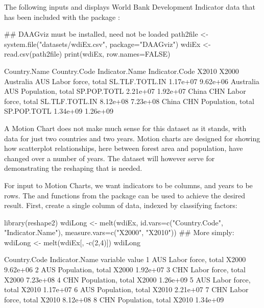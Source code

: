 The following inputs and displays World Bank Development Indicator
data that has been included with the package :
\begin{fullwidth}
\small
\begin{Schunk}
\begin{Sinput}
## DAAGviz must be installed, need not be loaded
path2file <- system.file("datasets/wdiEx.csv", package="DAAGviz")
wdiEx <- read.csv(path2file)
print(wdiEx, row.names=FALSE)
\end{Sinput}
\begin{Soutput}
 Country.Name Country.Code     Indicator.Name Indicator.Code    X2010    X2000
    Australia          AUS Labor force, total SL.TLF.TOTL.IN 1.17e+07 9.62e+06
    Australia          AUS  Population, total    SP.POP.TOTL 2.21e+07 1.92e+07
        China          CHN Labor force, total SL.TLF.TOTL.IN 8.12e+08 7.23e+08
        China          CHN  Population, total    SP.POP.TOTL 1.34e+09 1.26e+09
\end{Soutput}
\end{Schunk}
\end{fullwidth}

A  Motion Chart does not make much sense for this
dataset as it stands, with data for just two countries and two years.
Motion charts are designed for showing how scatterplot relationships,
here between forest area and population, have changed over a number of
years.  The dataset will however serve for demonstrating the reshaping
that is needed.

For input to Motion Charts, we want indicators to be
columns, and years to be rows.  The  and
  functions from the 
  package can be used to achieve the desired result.  First, create a
  single column of data, indexed by classifying factors:
\begin{Schunk}
\begin{Sinput}
library(reshape2)
wdiLong <- melt(wdiEx, id.vars=c("Country.Code",
                "Indicator.Name"),
                measure.vars=c("X2000", "X2010"))
## More simply: wdiLong <- melt(wdiEx[, -c(2,4)])
wdiLong
\end{Sinput}
\begin{Soutput}
  Country.Code     Indicator.Name variable    value
1          AUS Labor force, total    X2000 9.62e+06
2          AUS  Population, total    X2000 1.92e+07
3          CHN Labor force, total    X2000 7.23e+08
4          CHN  Population, total    X2000 1.26e+09
5          AUS Labor force, total    X2010 1.17e+07
6          AUS  Population, total    X2010 2.21e+07
7          CHN Labor force, total    X2010 8.12e+08
8          CHN  Population, total    X2010 1.34e+09
\end{Soutput}
\end{Schunk}

